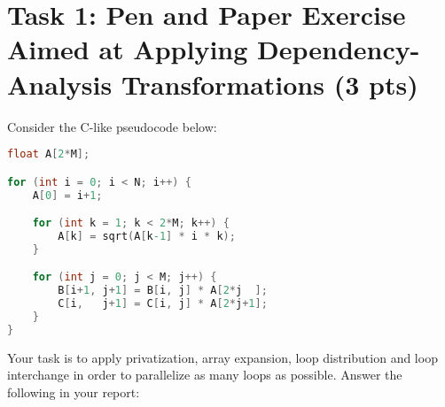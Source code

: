 \documentclass{article}
\begin{document}
\newpage
\section{Task 1: Pen and Paper Exercise Aimed at Applying Dependency-Analysis Transformations (3 pts)}

Consider the C-like pseudocode below:

\begin{lstlisting}[language=C]
float A[2*M];

for (int i = 0; i < N; i++) {
    A[0] = i+1;

    for (int k = 1; k < 2*M; k++) {
        A[k] = sqrt(A[k-1] * i * k);
    }

    for (int j = 0; j < M; j++) {
        B[i+1, j+1] = B[i, j] * A[2*j  ];
        C[i,   j+1] = C[i, j] * A[2*j+1];
    }
}
\end{lstlisting}

Your task is to apply privatization, array expansion, loop distribution 
and loop interchange in order to parallelize as many loops as possible.
Answer the following in your report:
\end{document}
